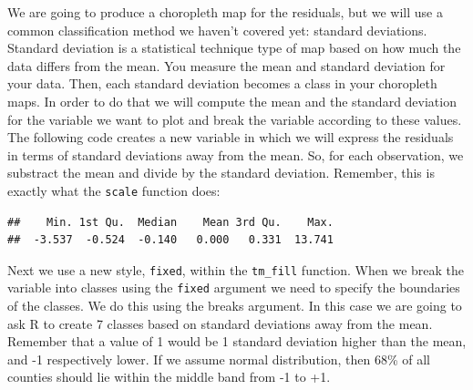 \documentclass[
  krantz2]{krantz}
\makeatletter
\newenvironment{Shaded}{\begin{snugshade}}{\end{snugshade}}
\newcommand{\CommentTok}[1]{\textcolor[rgb]{0.37,0.37,0.37}{\textit{#1}}}
\newcommand{\DecValTok}[1]{\textcolor[rgb]{0.06,0.06,0.06}{#1}}
\newcommand{\FunctionTok}[1]{\textcolor[rgb]{0,0,0}{#1}}
\newcommand{\NormalTok}[1]{#1}
\newcommand{\OtherTok}[1]{\textcolor[rgb]{0.37,0.37,0.37}{#1}}
\newcommand{\SpecialCharTok}[1]{\textcolor[rgb]{0,0,0}{#1}}
\newenvironment{kframe}{%
\medskip{}
\setlength{\fboxsep}{.8em}
 \def\at@end@of@kframe{}%
 \ifinner\ifhmode%
  \def\at@end@of@kframe{\end{minipage}}%
  \begin{minipage}{\columnwidth}%
 \fi\fi%
 \def\FrameCommand##1{\hskip\@totalleftmargin \hskip-\fboxsep
 \colorbox{shadecolor}{##1}\hskip-\fboxsep
     \hskip-\linewidth \hskip-\@totalleftmargin \hskip\columnwidth}%
 \MakeFramed {\advance\hsize-\width
   \@totalleftmargin\z@ \linewidth\hsize
   \@setminipage}}%
 {\par\unskip\endMakeFramed%
 \at@end@of@kframe}
\renewenvironment{Shaded}{\begin{kframe}}{\end{kframe}}
\makeatother
\begin{document}
We are going to produce a choropleth map for the residuals, but we will use a common classification method we haven't covered yet: standard deviations. Standard deviation is a statistical technique type of map based on how much the data differs from the mean. You measure the mean and standard deviation for your data. Then, each standard deviation becomes a class in your choropleth maps. In order to do that we will compute the mean and the standard deviation for the variable we want to plot and break the variable according to these values. The following code creates a new variable in which we will express the residuals in terms of standard deviations away from the mean. So, for each observation, we substract the mean and divide by the standard deviation. Remember, this is exactly what the \texttt{scale} function does:

\begin{Shaded}
\end{Shaded}

\begin{verbatim}
##    Min. 1st Qu.  Median    Mean 3rd Qu.    Max. 
##  -3.537  -0.524  -0.140   0.000   0.331  13.741
\end{verbatim}

Next we use a new style, \texttt{fixed}, within the \texttt{tm\_fill} function. When we break the variable into classes using the \texttt{fixed} argument we need to specify the boundaries of the classes. We do this using the breaks argument. In this case we are going to ask R to create 7 classes based on standard deviations away from the mean. Remember that a value of 1 would be 1 standard deviation higher than the mean, and -1 respectively lower. If we assume normal distribution, then 68\% of all counties should lie within the middle band from -1 to +1.
\end{document}
